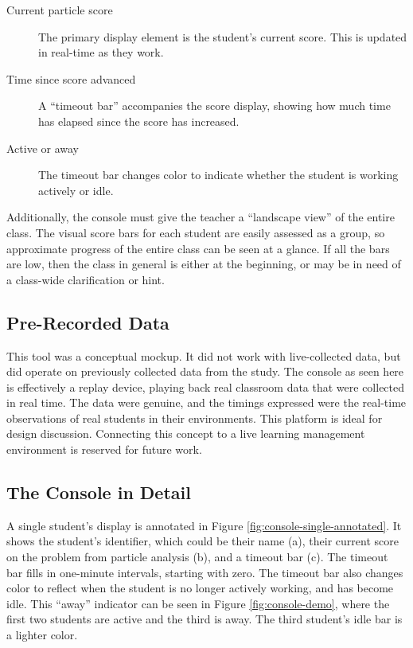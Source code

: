 \begin{description}
\item [Current particle score] The primary display element is the student's current score. This is updated in real-time as they work.
\item [Time since score advanced] A ``timeout bar'' accompanies the score display, showing how much time has elapsed since the score has increased.
\item [Active or away] The timeout bar changes color to indicate whether the student is working actively or idle.
\end{description}

Additionally, the console must give the teacher a ``landscape view'' of the entire class. The visual score bars for each student are easily assessed as a group, so approximate progress of the entire class can be seen at a glance. If all the bars are low, then the class in general is either at the beginning, or may be in need of a class-wide clarification or hint. 

\subsection{Pre-Recorded Data}
This tool was a conceptual mockup. It did not work with live-collected data, but did operate on previously collected data from the study. The console as seen here is effectively a replay device, playing back real classroom data that were collected in real time. The data were genuine, and the timings expressed were the real-time observations of real students in their environments. This platform is ideal for design discussion. Connecting this concept to a live learning management environment is reserved for future work. 

\subsection{The Console in Detail}
A single student's display is annotated in Figure \ref{fig:console-single-annotated}. It shows the student's identifier, which could be their name (a), their current score on the problem from particle analysis (b), and a timeout bar (c). The timeout bar fills in one-minute intervals, starting with zero. The timeout bar also changes color to reflect when the student is no longer actively working, and has become idle. This ``away'' indicator can be seen in Figure \ref{fig:console-demo}, where the first two students are active and the third is away. The third student's idle bar is a lighter color.


